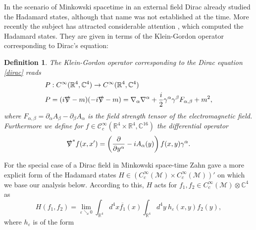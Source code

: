 \documentclass[a4paper,11pt]{article}
\newtheorem{de}{Definition}
\begin{document}
In the scenario of Minkowski spacetime in an external field Dirac \cite{Dirac34} already studied the Hadamard states, although that name was not established at the time.
More recently the subject has attracted considerable attention \cite{zahn2014renormalized, schlemmer2015current}, which computed the Hadamard states. 
They are given in terms of the Klein-Gordon operator corresponding to Dirac's equation:


\begin{de}
The Klein-Gordon operator corresponding to the Dirac equation \eqref{dirac} reads
\begin{align}
&P: C^\infty(\mathbb{R}^4,\mathbb{C}^4)\rightarrow C^\infty(\mathbb{R}^4,\mathbb{C}^4)\\
&P=(i\slashed{\nabla}-m)(-i\slashed{\nabla}-m)=\nabla_\alpha \nabla^\alpha + \frac{i}{2} \gamma^\alpha \gamma^\beta F_{\alpha,\beta} +m^2,
\end{align}
where \(F_{\alpha,\beta}=\partial_\alpha A_\beta - \partial_\beta A_\alpha\) is the field strength tensor of the electromagnetic field. Furthermore we 
define for \(f\in \mathcal{C}_c^\infty(\mathbb{R}^4\times \mathbb{R}^4,\mathbb{C}^{16})\) the differential operator
\begin{equation}
\slashed{\nabla}^* f(x,x')=\left(\frac{\partial}{\partial y^\alpha} - i A_\alpha(y)\right)f(x,y)\gamma^\alpha.
\end{equation}
\end{de}


For the special case of a Dirac field in Minkowski space-time Zahn \cite{schlemmer2015current} gave a more explicit form of
the Hadamard states \(H \in (C_c^\infty(\mathcal{M})\times C_c^\infty(\mathcal{M}))'\)  on which we base our analysis below.
According to this, \(H\) 
acts for \(f_1,f_2\in C_c^\infty(\mathcal{M})\otimes \mathbb{C}^4\) as 
\begin{equation}\label{eq:hadamard1}
H(f_1,f_2)=\lim_{\varepsilon\searrow 0} \int_{\mathbb{R}^4}d^4 x \overline{f_1}(x) \int_{\mathbb{R}^4} d^4y ~h_\varepsilon(x,y) f_2(y),
\end{equation}
where \(h_\varepsilon\) is of the form
\end{document}
